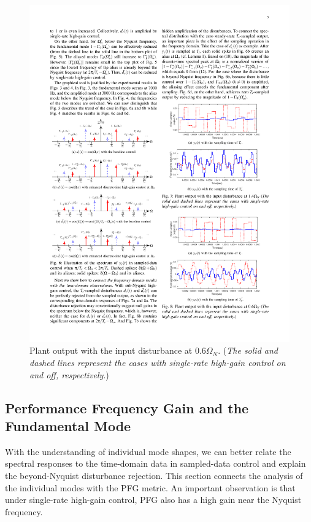 \documentclass [11pt, proquest] {uwthesis}[2020/02/24]
\begin{document}
\begin{figure}[!ht]
\begin{centering}
{\begin{centering}
\includegraphics[width=12cm]{Spectral-analysis/FIG8b.pdf}
\par\end{centering}
}
\par\end{centering}
\caption{\label{fig:Plant-output-for-4}Plant output with the input disturbance
at $0.6\Omega_{N}$. (\emph{The solid and dashed lines represent the
cases with single-rate high-gain control on and off, respectively}.)}
\end{figure}

\subsection{Performance Frequency Gain and the Fundamental Mode} \label{subsec:Performance-Frequency-Gain-and}

With the understanding of individual mode shapes, we can better relate
the spectral responses to the time-domain data in sampled-data control
and explain the beyond-Nyquist disturbance rejection. This section
connects the analysis of the individual modes with the PFG metric.
An important observation is that under single-rate high-gain control,
PFG also has a high gain near the Nyquist frequency.
\end{document}
